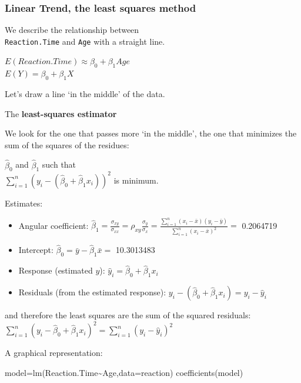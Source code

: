 \documentclass[
]{article}
\newenvironment{Shaded}{\begin{snugshade}}{\end{snugshade}}
\newcommand{\AttributeTok}[1]{\textcolor[rgb]{0.77,0.63,0.00}{#1}}
\newcommand{\FunctionTok}[1]{\textcolor[rgb]{0.00,0.00,0.00}{#1}}
\newcommand{\NormalTok}[1]{#1}
\newcommand{\OtherTok}[1]{\textcolor[rgb]{0.56,0.35,0.01}{#1}}
\newcommand{\SpecialCharTok}[1]{\textcolor[rgb]{0.00,0.00,0.00}{#1}}
\providecommand{\tightlist}{%
  \setlength{\itemsep}{0pt}\setlength{\parskip}{0pt}}
\begin{document}
\hypertarget{linear-trend-the-least-squares-method}{%
\subsubsection{Linear Trend, the least squares
method}\label{linear-trend-the-least-squares-method}}

We describe the relationship between\\
\texttt{Reaction.Time} and \texttt{Age} with a straight line.

\(E(Reaction.Time) \approx \beta_0 + \beta_1 Age\)\\
\(E(Y)=\beta_0 + \beta_1X\)

Let's draw a line `in the middle' of the data.

The \textbf{least-squares estimator}

We look for the one that passes more `in the middle', the one that
minimizes the sum of the squares of the residues:

\(\hat{\beta}_0\) and \(\hat{\beta}_1\) such that\\
\(\sum_{i=1} ^ n (y_i - (\hat{\beta}_0 + \hat{\beta}_1x_i )) ^ 2\) is
minimum.

Estimates:

\begin{itemize}
\tightlist
\item
  Angular coefficient:
  \(\hat{\beta}_1=\frac{\sigma_{xy}}{\sigma_{xx}}=\rho_{xy}\frac{\sigma_{y}}{\sigma_{x}}=\frac{\sum_{i=1}^n(x_i- \bar{x})(y_i-\bar{y})}{\sum_{i=1}^n (x_i-\bar{x})^2}=\)
  0.2064719\\
\item
  Intercept: \(\hat{\beta}_0=\bar{y}-\hat{\beta}_1\bar{x}=\) 10.3013483
\item
  Response (estimated \(y\)):
  \(\hat{y}_i=\hat{\beta}_0 + \hat{\beta}_1x_i\)
\item
  Residuals (from the estimated response):
  \(y_i - (\hat{\beta}_0 + \hat{\beta}_1 x_i)=y_i- \hat{y}_i\)
\end{itemize}

and therefore the least squares are the sum of the squared residuals:
\(\sum_{i=1} ^ n (y_i- \hat{\beta}_0 + \hat{\beta}_1x_i) ^ 2=\sum_{i=1} ^ n (y_i- \hat{y}_i ) ^ 2\)

A graphical representation:

\begin{Shaded}
\begin{Highlighting}[]
\NormalTok{model}\OtherTok{=}\FunctionTok{lm}\NormalTok{(Reaction.Time}\SpecialCharTok{\textasciitilde{}}\NormalTok{Age,}\AttributeTok{data=}\NormalTok{reaction)}
\FunctionTok{coefficients}\NormalTok{(model)}
\end{Highlighting}
\end{Shaded}
\end{document}
